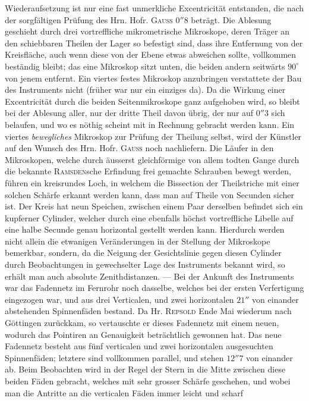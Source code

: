 Wiederaufsetzung ist nur eine fast unmerkliche Excentricität entstanden, die nach der sorgfältigen
Prüfung des Hrn. Hofr. \textsc{Gauss} $0''8$ beträgt. Die Ablesung geschieht durch drei vortreffliche
mikrometrische Mikroskope, deren Träger an den schiebbaren Theilen der Lager so befestigt sind, dass
ihre Entfernung von der Kreisfläche, auch wenn diese von der Ebene etwas abweichen sollte,
vollkommen beständig bleibt; das eine Mikroskop sitzt unten, die beiden andern seitwärts $90^\circ$
von jenem entfernt. Ein viertes festes Mikroskop anzubringen verstattete der Bau des Instruments nicht
(früher war nur ein einziges da). Da die Wirkung einer Excentricität durch die beiden Seitenmikroskope
ganz aufgehoben wird, so bleibt bei der Ablesung aller, nur der dritte Theil davon übrig, der nur auf
$0''3$ sich belaufen, und wo es nöthig scheint mit in Rechnung gebracht werden kann. Ein viertes
\emph{bewegliches} Mikroskop zur Prüfung der Theilung selbst, wird der Künstler auf den Wunsch des Hrn.
Hofr. \textsc{Gauss} noch nachliefern. Die Läufer in den Mikroskopen, welche durch äusserst
gleichförmige von allem todten Gange durch die bekannte \textsc{Ramsden}sche Erfindung frei gemachte
Schrauben bewegt werden, führen ein kreisrundes Loch, in welchem die Bissection der Theilstriche mit
einer solchen Schärfe erkannt werden kann, dass man auf Theile von Secunden sicher ist. Der Kreis hat
neun Speichen, zwischen einem Paar derselben befindet sich ein kupferner Cylinder, welcher durch eine
ebenfalls höchst vortreffliche Libelle auf eine halbe Secunde genau horizontal gestellt werden kann.
Hierdurch werden nicht allein die etwanigen Veränderungen in der Stellung der Mikroskope bemerkbar,
sondern, da die Neigung der Gesichtslinie gegen diesen Cylinder durch Beobachtungen in gewechselter
Lage des Instruments bekannt wird, so erhält man auch absolute Zenithdistanzen. --- Bei der Ankunft
des Instruments war das Fadennetz im Fernrohr noch dasselbe, welches bei der ersten Verfertigung
eingezogen war, und aus drei Verticalen, und zwei horizontalen $21''$ von einander abstehenden
Spinnenfäden bestand. Da Hr. \textsc{Repsold} Ende Mai wiederum nach Göttingen zurückkam, so
vertauschte er dieses Fadennetz mit einem neuen, wodurch das Pointiren an Genauigkeit beträchtlich
gewonnen hat. Das neue Fadennetz besteht aus fünf verticalen und zwei horizontalen ausgesuchten
Spinnenfäden; letztere sind vollkommen parallel, und stehen $12''7$ von einander ab. Beim Beobachten
wird in der Regel der Stern in die Mitte zwischen diese beiden Fäden gebracht, welches mit sehr
grosser Schärfe geschehen, und wobei man die Antritte an die verticalen Fäden immer leicht und scharf
